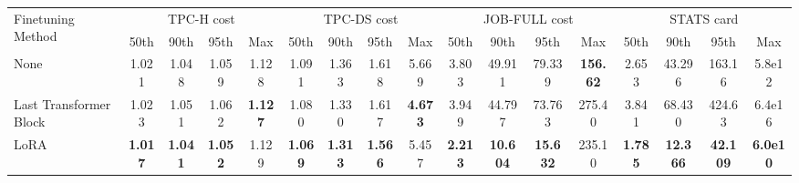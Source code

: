 \begin{tabular}{l|cccc|cccc|cccc|cccc}

\toprule

\multirow{2}{*}{Finetuning Method} & \multicolumn{4}{c|}{TPC-H cost} & \multicolumn{4}{c|}{TPC-DS cost} & \multicolumn{4}{c|}{JOB-FULL cost} & \multicolumn{4}{c|}{STATS card} \\

 & 50th & 90th & 95th & Max & 50th & 90th & 95th & Max & 50th & 90th & 95th & Max & 50th & 90th & 95th & Max \\

\midrule

None & 1.021 & 1.048 & 1.059 & 1.128 & 1.091 & 1.363 & 1.618 & 5.669 & 3.803 & 49.911 & 79.339 & \cellcolor{myorange}\textbf{156.62} & 2.653 & 43.296 & 163.16 & 5.8e12 \\
Last Transformer Block & 1.023 & 1.051 & 1.062 & \cellcolor{myorange}\textbf{1.127} & 1.080 & 1.330 & 1.617 & \cellcolor{myorange}\textbf{4.673} & 3.949 & 44.797 & 73.763 & 275.40 & 3.841 & 68.430 & 424.63 & 6.4e16 \\
LoRA & \cellcolor{myorange}\textbf{1.017} & \cellcolor{myorange}\textbf{1.041} & \cellcolor{myorange}\textbf{1.052} & 1.129 & \cellcolor{myorange}\textbf{1.069} & \cellcolor{myorange}\textbf{1.313} & \cellcolor{myorange}\textbf{1.566} & 5.457 & \cellcolor{myorange}\textbf{2.213} & \cellcolor{myorange}\textbf{10.604} & \cellcolor{myorange}\textbf{15.632} & 235.10 & \cellcolor{myorange}\textbf{1.785} & \cellcolor{myorange}\textbf{12.366} & \cellcolor{myorange}\textbf{42.109} & \cellcolor{myorange}\textbf{6.0e10} \\

\bottomrule
\end{tabular}